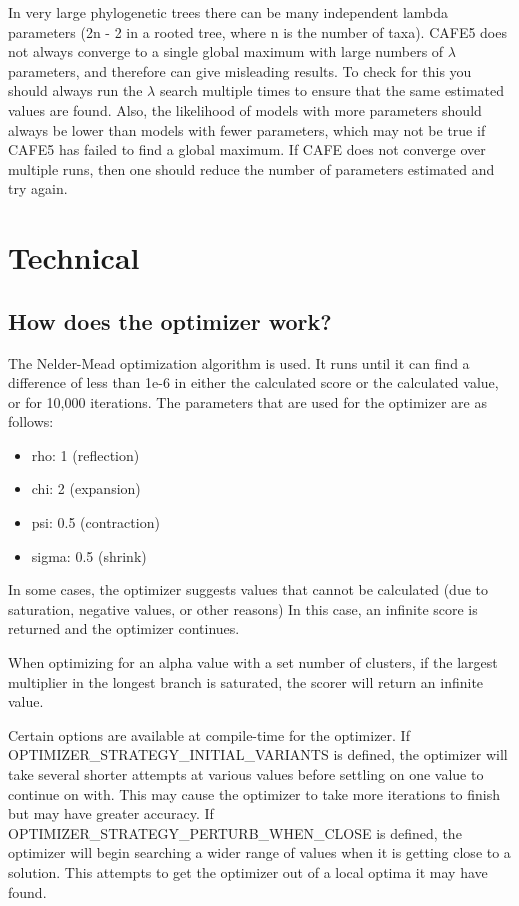 \documentclass{article}
\newcommand{\shortname}{CAFE5 }
\begin{document}
In very large phylogenetic trees there can be many independent lambda parameters (2n - 2 in a rooted tree, where n is the number of taxa). \shortname does not always converge to a single global maximum with large numbers of $\lambda$ parameters, and therefore can give misleading results. To check for this you should always run the $\lambda$ search multiple times to ensure that the same estimated values are found. Also, the likelihood of models with more parameters should always be lower than models with fewer parameters, which may not be true if \shortname has failed to find a global maximum. If CAFE does not converge over multiple runs, then one should reduce the number of parameters estimated and try again.

\section{Technical}

\subsection{How does the optimizer work?}

The Nelder-Mead optimization algorithm is used. It runs until it can find a difference of less than 1e-6 in either the calculated score or the calculated value, or for 10,000 iterations. The parameters that are used for the optimizer are as follows:

\begin{itemize}
  \item rho: 1 (reflection)
  \item chi: 2 (expansion)
  \item psi: 0.5 (contraction)
  \item sigma: 0.5 (shrink)
\end{itemize}

In some cases, the optimizer suggests values that cannot be calculated (due to saturation, negative values, or other reasons) In this case, an infinite score is returned and the optimizer continues.

When optimizing for an alpha value with a set number of clusters, if the largest multiplier in the longest branch is saturated, the scorer will return an infinite value.

Certain options are available at compile-time for the optimizer. If OPTIMIZER\_STRATEGY\_INITIAL\_VARIANTS is defined, the optimizer
will take several shorter attempts at various values 
before settling on one value to continue on with. This may cause the optimizer to take more iterations to finish but may have 
greater accuracy. If OPTIMIZER\_STRATEGY\_PERTURB\_WHEN\_CLOSE is defined, the optimizer will begin searching a wider range of values
when it is getting close to a solution. This attempts to get the optimizer out of a local optima it may have found.
\end{document}
